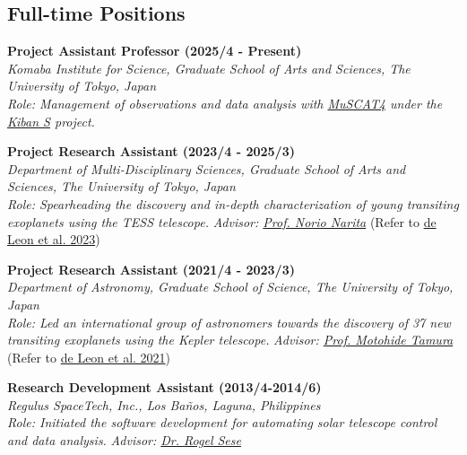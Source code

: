 \documentclass[11pt,letterpaper]{article}
\begin{document}
\subsection{Full-time Positions}
\begin{list}{}{\cvlist}
    \item
        \textbf{Project Assistant Professor (2025/4 - Present)} \\
        \textit{Komaba Institute for Science, Graduate School of Arts and Sciences, The University of Tokyo, Japan} \\
        \textit{Role: Management of observations and data analysis with \href{\muscatLCOurl}{MuSCAT4} under the \href{\kibanSurl}{Kiban S} project.}\\
        
    \item
        \textbf{Project Research Assistant (2023/4 - 2025/3)} \\
        \textit{Department of Multi-Disciplinary Sciences, Graduate School of Arts and Sciences, The University of Tokyo, Japan} \\
        \textit{Role: Spearheading the discovery and in-depth characterization of young transiting exoplanets using the TESS telescope.}
        \textit{Advisor: \href{\naritaurl}{Prof. Norio Narita}} (Refer to \href{\paperthree}{de Leon et al. 2023})\\

    \item
        \textbf{Project Research Assistant (2021/4 - 2023/3)} \\
        \textit{Department of Astronomy, Graduate School of Science, The University of Tokyo, Japan} \\
        \textit{Role: Led an international group of astronomers towards the discovery of 37 new transiting exoplanets using the Kepler telescope.}
        \textit{Advisor: \href{tamuraurl}{Prof. Motohide Tamura}} (Refer to \href{\papertwo}{de Leon et al. 2021})\\
        
    \item
        \textbf{Research Development Assistant (2013/4-2014/6)}\\
        \textit{Regulus SpaceTech, Inc., Los Ba\~nos, Laguna, Philippines}\\
        \textit{Role: Initiated the software development for automating solar telescope control and data analysis.}
        \textit{Advisor: \href{\seseurl}{Dr. Rogel Sese}} \\
\end{list}
\end{document}
